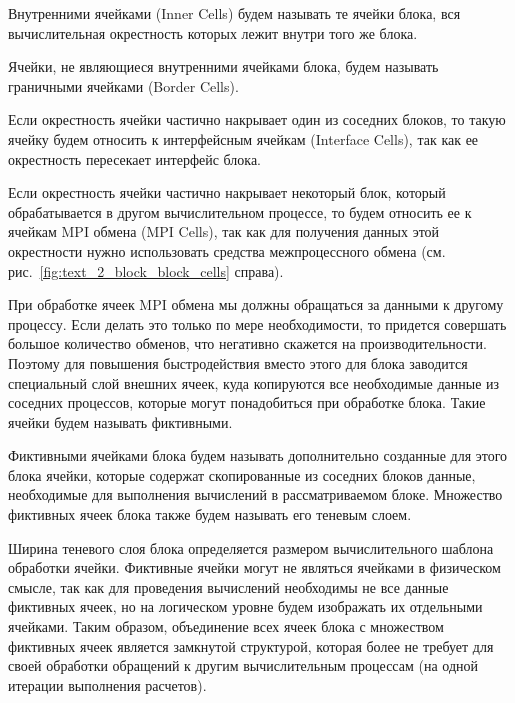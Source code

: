 \begin{definition}
Внутренними ячейками (Inner Cells) будем называть те ячейки блока, вся вычислительная окрестность которых лежит внутри того же блока.
\end{definition}

\begin{definition}
Ячейки, не являющиеся внутренними ячейками блока, будем называть граничными ячейками (Border Cells).
\end{definition}

\begin{definition}
Если окрестность ячейки частично накрывает один из соседних блоков, то такую ячейку будем относить к интерфейсным ячейкам (Interface Cells), так как ее окрестность пересекает интерфейс блока.
\end{definition}

\begin{definition}
Если окрестность ячейки частично накрывает некоторый блок, который обрабатывается в другом вычислительном процессе, то будем относить ее к ячейкам MPI обмена (MPI Cells), так как для получения данных этой окрестности нужно использовать средства межпроцессного обмена (см. рис.~\ref{fig:text_2_block_block_cells} справа).
\end{definition}

При обработке ячеек MPI обмена мы должны обращаться за данными к другому процессу.
Если делать это только по мере необходимости, то придется совершать большое количество обменов, что негативно скажется на производительности.
Поэтому для повышения быстродействия вместо этого для блока заводится специальный слой внешних ячеек, куда копируются все необходимые данные из соседних процессов, которые могут понадобиться при обработке блока.
Такие ячейки будем называть фиктивными.

\begin{definition}
Фиктивными ячейками блока будем называть дополнительно созданные для этого блока ячейки, которые содержат скопированные из соседних блоков данные, необходимые для выполнения вычислений в рассматриваемом блоке.
Множество фиктивных ячеек блока также будем называть его теневым слоем.
\end{definition}

Ширина теневого слоя блока определяется размером вычислительного шаблона обработки ячейки.
Фиктивные ячейки могут не являться ячейками в физическом смысле, так как для проведения вычислений необходимы не все данные фиктивных ячеек, но на логическом уровне будем изображать их отдельными ячейками.
Таким образом, объединение всех ячеек блока с множеством фиктивных ячеек является замкнутой структурой, которая более не требует для своей обработки обращений к другим вычислительным процессам (на одной итерации выполнения расчетов).

